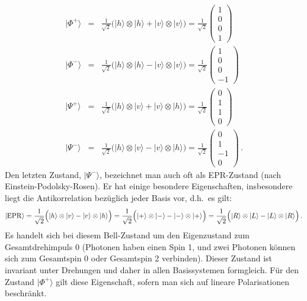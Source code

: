 \begin{eqnarray}
      |\Phi^+ \rangle &=&  \frac{1}{\sqrt{2}} \Big( |h\rangle \otimes |h\rangle + |v\rangle \otimes |v\rangle \Big)
            = \frac{1}{\sqrt{2}} \left( \begin{array}{c}  1 \\ 0 \\ 0 \\ 1 \end{array} \right)   \\[0.2cm]  
      |\Phi^- \rangle &=&  \frac{1}{\sqrt{2}} \Big( |h\rangle \otimes |h\rangle - |v\rangle \otimes |v\rangle \Big)
            = \frac{1}{\sqrt{2}} \left( \begin{array}{c}  1 \\ 0 \\ 0 \\ -1 \end{array} \right)   \\[0.2cm]
      |\Psi^+ \rangle &=&  \frac{1}{\sqrt{2}} \Big( |h\rangle \otimes |v\rangle + |v\rangle \otimes |h\rangle \Big)
            = \frac{1}{\sqrt{2}} \left( \begin{array}{c}  0 \\ 1 \\ 1 \\ 0 \end{array} \right)   \\[0.2cm]  
      |\Psi^- \rangle &=&  \frac{1}{\sqrt{2}} \Big( |h\rangle \otimes |v\rangle - |v\rangle \otimes |h\rangle \Big)
            = \frac{1}{\sqrt{2}} \left( \begin{array}{c}  0 \\ 1 \\ - 1 \\ 0 \end{array} \right)    \, .
\end{eqnarray}
Den letzten Zustand, $|\Psi^- \rangle$, bezeichnet man auch oft als EPR-Zustand (nach Einstein-Podolsky-Rosen). 
Er hat einige besondere Eigenschaften, insbesondere liegt die Antikorrelation bez\"uglich jeder Basis vor, d.h.\
es gilt:
\begin{equation}
  |{\rm EPR} \rangle = \frac{1}{\sqrt{2}} \Big( |h\rangle \otimes |v\rangle - |v\rangle \otimes |h\rangle \Big) 
  = \frac{1}{\sqrt{2}} \Big( |+\rangle \otimes |-\rangle - |-\rangle \otimes |+\rangle \Big) =
    \frac{1}{\sqrt{2}} \Big( |R\rangle \otimes |L\rangle - |L\rangle \otimes |R\rangle \Big) \, .
\end{equation}
Es handelt sich bei diesem Bell-Zustand um den Eigenzustand zum Gesamtdrehimpuls 0 (Photonen haben einen
Spin 1, und zwei Photonen k\"onnen sich zum Gesamtspin 0 oder Gesamtspin 2 verbinden). Dieser Zustand
ist invariant unter Drehungen und daher in allen Basissystemen formgleich. F\"ur den Zustand $|\Phi^+\rangle$
gilt diese Eigenschaft, sofern man sich auf lineare Polarisationen beschr\"ankt.
 


